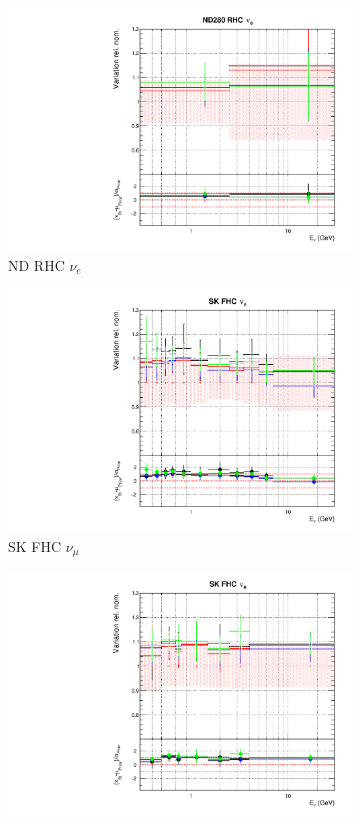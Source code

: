 \begin{figure}[t]
\begin{subfigure}{0.24\textwidth}
  \includegraphics[width=0.95\linewidth]{figs/detcovbinflux_7}
  \caption{ND RHC $\nu_e$}
  \label{fig:}
\end{subfigure}
\begin{subfigure}{0.24\textwidth}
  \centering
  \includegraphics[width=0.95\linewidth]{figs/detcovbinflux_8}
  \caption{SK FHC $\nu_{\mu}$}
  \label{fig:}
\end{subfigure}
\begin{subfigure}{0.24\textwidth}
  \centering
  \includegraphics[width=0.95\linewidth]{figs/detcovbinflux_9}

\end{subfigure}
\end{figure}
